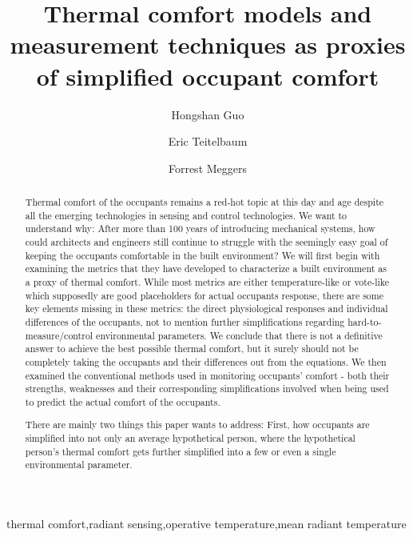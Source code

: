 \documentclass[review]{elsarticle}
\begin{document}
\begin{frontmatter}
\title{Thermal comfort models and measurement techniques as proxies of simplified occupant comfort}
\author[mymainaddress]{Hongshan Guo}
\author[mymainaddress]{Eric Teitelbaum}
\author[mymainaddress,mysecondaryaddress]{Forrest Meggers}
\address[mymainaddress]{School of Architecture, Princeton University, USA}
\address[mysecondaryaddress]{Andlinger Center for Energy and the Environment, Princeton University, USA.}
\begin{abstract}
Thermal comfort of the occupants remains a red-hot topic at this day and age despite all the emerging technologies in sensing and control technologies. We want to understand why: After more than 100 years of introducing mechanical systems, how could architects and engineers still continue to struggle with the seemingly easy goal of keeping the occupants comfortable in the built environment? 
We will first begin with examining the metrics that they have developed to characterize a built environment as a proxy of thermal comfort. 
While most metrics are either temperature-like or vote-like which supposedly are good placeholders for actual occupants response, there are some key elements missing in these metrics: the direct physiological responses and individual differences of the occupants, not to mention further simplifications regarding hard-to-measure/control environmental parameters.
We conclude that there is not a definitive answer to achieve the best possible thermal comfort, but it surely should not be completely taking the occupants and their differences out from the equations.
We then examined the conventional methods used in monitoring occupants' comfort - both their strengths, weaknesses and their corresponding simplifications involved when being used to predict the actual comfort of the occupants.

There are mainly two things this paper wants to address: First, how occupants are simplified into not only an average hypothetical person, where the hypothetical person's thermal comfort gets further simplified into a few or even a single environmental parameter.

\end{abstract}
\begin{keyword}thermal comfort\sep radiant sensing\sep operative temperature\sep mean radiant temperature\end{keyword}\end{frontmatter}
\tableofcontents
\end{document}
